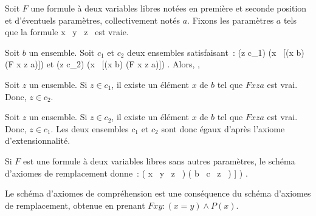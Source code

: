 \blank[medium]

\noindent{} 
    Soit $F$ une formule à deux variables libres notées en première et seconde position et d'éventuels paramètres, collectivement notés $a$. 
    Fixons les paramètres $a$ tels que la formule
    \startformula
        \forall x \, \forall y \, \forall z \, \left[
            (F x y a \wedge F x z a) \Rightarrow (z = y)
        \right]
    \stopformula
    est vraie. 
    
    Soit $b$ un ensemble. 
    Soit $c_1$ et $c_2$ deux ensembles satisfaisant : 
    \startformula
        (z \in c_1) \Leftrightarrow (\exists x \, [(x \in b) \wedge (F x z a)])
    \stopformula
    et 
    \startformula
        (z \in c_2) \Leftrightarrow (\exists x \, [(x \in b) \wedge (F x z a)]) .
    \stopformula
    Alors, ,
    \startitemize[nowhite]
        \item Soit $z$ un ensemble. 
            Si $z \in c_1$, il existe un élément $x$ de $b$ tel que $F x z a$ est vrai. 
            Donc, $z \in c_2$.
        \item Soit $z$ un ensemble. 
            Si $z \in c_2$, il existe un élément $x$ de $b$ tel que $F x z a$ est vrai. 
            Donc, $z \in c_1$.
    \stopitemize
    Les deux ensembles $c_1$ et $c_2$ sont donc égaux d'après l'axiome d'extensionnalité.

   \done 

\blank[medium]

Si $F$ est une formule à deux variables libres sans autres paramètres, le schéma d'axiomes de remplacement donne :
\startformula
    \left( 
        \forall x \, \forall y \, \forall z \, \left[
            (F x y \wedge F x z) \Rightarrow (z = y)
        \right]
    \right)
    \Rightarrow
    \left(
        \forall b \, \exists c \, \forall z \, \left[
            (z \in c) \Leftrightarrow (\exists x \, [(x \in b) \wedge (F x z)])
        \right]
    \right)
.
\stopformula

\blank[medium]

\noindent{} Le schéma d'axiomes de compréhension est une conséquence du schéma d'axiomes de remplacement, obtenue en prenant $F x y : (x = y) \wedge P(x)$. 

\blank[medium]

